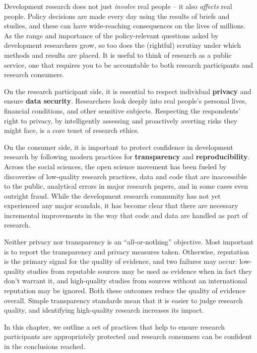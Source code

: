 
\begin{fullwidth}

	Development research does not just \textit{involve} real people -- it also \textit{affects} real people.
	Policy decisions are made every day using the results of briefs and studies,
	and these can have wide-reaching consequences on the lives of millions.
	As the range and importance of the policy-relevant questions asked by development researchers grow,
	so too does the (rightful) scrutiny under which methods and results are placed.	
	It is useful to think of research as a public service, 
	one that requires you to be accountable to both research participants and research consumers. 		
	
	On the research participant side, 
	it is essential to respect individual \textbf{privacy} and ensure \textbf{data security}. 
	Researchers look deeply into real people's personal lives, financial conditions, and other sensitive subjects.
	Respecting the respondents' right to privacy, 
	by intelligently assessing and proactively averting risks they might face, 
	is a core tenet of research ethics.
	
	On the consumer side, it is important to protect confidence in development research 
	by following modern practices for \textbf{transparency} and \textbf{reproducibility}. 
	Across the social sciences, the open science movement has been fueled by discoveries of low-quality research practices,
	data and code that are inaccessible to the public, analytical errors in major research papers,
	and in some cases even outright fraud. While the development research community has not yet
	experienced any major scandals, it has become clear that there are necessary incremental improvements 
	in the way that code and data are handled as part of research.

	Neither privacy nor transparency is an ``all-or-nothing'' objective.
	Most important is to report the transparency and privacy measures taken.
	Otherwise, reputation is the primary signal for the quality of evidence, and two failures may occur:
	low-quality studies from reputable sources may be used as evidence when in fact they don't warrant it,
	and high-quality studies from sources without an international reputation may be ignored.
	Both these outcomes reduce the quality of evidence overall.
	Simple transparency standards mean that it is easier to judge research quality,
	and identifying high-quality research  increases its impact.

	In this chapter, we outline a set of practices that help to ensure
	research participants are appropriately protected and
	research consumers can be confident in the conclusions reached.
	
\end{fullwidth}

